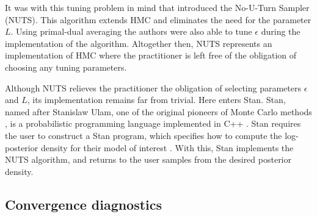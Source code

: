 It was with this tuning problem in mind that \textcite{hoffman14} introduced the No-U-Turn
Sampler (NUTS). This algorithm extends HMC and eliminates the need for the parameter $L$.
Using primal-dual averaging the authors were also able to tune $\epsilon$ during the
implementation of the algorithm. Altogether then, NUTS represents an implementation of HMC
where the practitioner is left free of the obligation of choosing any tuning parameters.

Although NUTS relieves the practitioner the obligation of selecting parameters $\epsilon$
and $L$, its implementation remains far from trivial. Here enters Stan. Stan, named after
Stanislaw Ulam, one of the original pioneers of Monte Carlo methods
\parencite{metropolis49}, is a probabilistic programming language implemented in C++
\parencite{gelman15}. Stan requires the user to construct a Stan program, which specifies
how to compute the log-posterior density for their model of interest
\parencite{stanteam15}. With this, Stan implements the NUTS algorithm, and returns to the
user samples from the desired posterior density.

\subsection{Convergence diagnostics}
\label{ssec:convergence_diagnostics}

